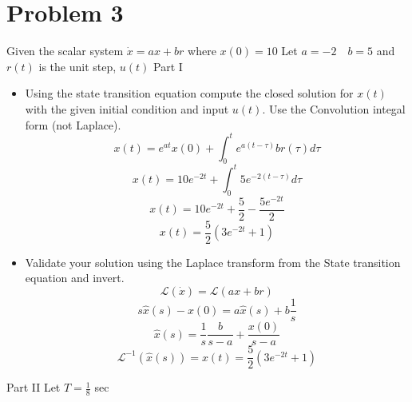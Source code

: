 \documentclass{article}
\begin{document}
\newpage
\section*{Problem 3}
Given the scalar system $\dot{x} = ax + br$ where $x(0)=10$
Let $ a = -2 \quad b = 5$ and $r(t)$ is the unit step, $u(t)$
\newline
Part I
\begin{itemize}[$\bullet$]
\item Using the state transition equation compute the closed solution for $x(t)$ with the given initial condition and input $u(t)$.
Use the Convolution integal form (not Laplace).
\newline
\newline
$$ x(t)
=
e^{at}x(0) + \int_0^t e^{a(t-\tau)}br(\tau) d\tau
$$
$$
x(t)
=
10e^{-2t} + \int_0^t 5e^{-2(t-\tau)} d\tau
$$
$$
x(t)
=
10e^{-2t} + \frac{5}{2}-\frac{5 e^{-2 t}}{2}
$$
$$
x(t)
=
\frac{5}{2} (3 e^{-2 t}+1)
$$
\item Validate your solution using the Laplace transform from the State transition equation and invert.
$$\mathcal{L}(\dot{x}) = \mathcal{L}(ax + br)$$
$$s\hat{x}(s) - x(0) = a\hat{x}(s) + b\frac{1}{s}$$
$$\hat{x}(s) = \frac{1}{s}\frac{b}{s-a} + \frac{x(0)}{s-a}$$
$$\mathcal{L}^{-1}(\hat{x}(s)) = x(t) = \frac{5}{2} \left(3 e^{-2 t}+1\right)$$
\newline
\newline
\end{itemize}
Part II
\indent Let $T=\frac{1}{8}$ sec
\end{document}
